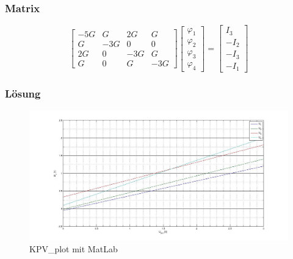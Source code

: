 \documentclass[10pt]{report}
\begin{document}
        \subsubsection{Matrix}
        \begin{equation*}
            \begin{bmatrix}
                -5G & G & 2G & G\\
                G & -3G & 0 & 0\\
                2G & 0 & -3G & G\\
                G & 0 & G & -3G
            \end{bmatrix}
            \begin{bmatrix}
                \varphi_1 \\
                \varphi_2 \\
                \varphi_3 \\
                \varphi_4
            \end{bmatrix}
            =
            \begin{bmatrix}
                I_3\\
                -I_2\\
                -I_3\\
                -I_1
            \end{bmatrix}
        \end{equation*}

        \subsubsection{Lösung}

        \begin{figure}[H]
            \includegraphics[width=\textwidth]{KPV.jpg}
          \caption{KPV\_plot mit MatLab}
        \end{figure}
\end{document}
